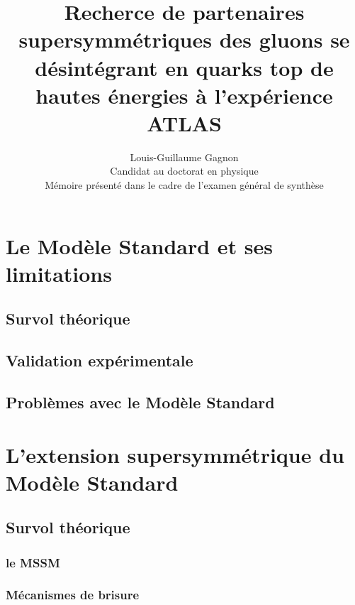 \documentclass[12pt,canadien]{article}
\title{\textbf{Recherce de partenaires supersymmétriques des gluons se
  désintégrant en quarks top de hautes énergies à l'expérience ATLAS}}
\author{Louis-Guillaume Gagnon \\ Candidat au doctorat en physique \\ Mémoire présenté dans le cadre de l'examen général de synthèse}
\begin{document}


\tableofcontents{}
\clearpage
\doublespacing

\section{Le Modèle Standard et ses limitations}
\label{sec:ms}

\blindtext

\subsection{Survol théorique}
\label{sec:ms:th}

\blindtext[5]

\subsection{Validation expérimentale}
\label{sec:ms:exp}

\subsection{Problèmes avec le Modèle Standard}
\label{sec:ms:problemes}

\singlespacing{}
\section{L'extension supersymmétrique du Modèle Standard}
\label{sec:susy}
\doublespacing{}

\subsection{Survol théorique}
\label{sec:susy:th}

\subsubsection{le MSSM}
\label{sec:susy:th:mssm}

\subsubsection{Mécanismes de brisure }
\label{sec:susy:th:breaking}
\end{document}
